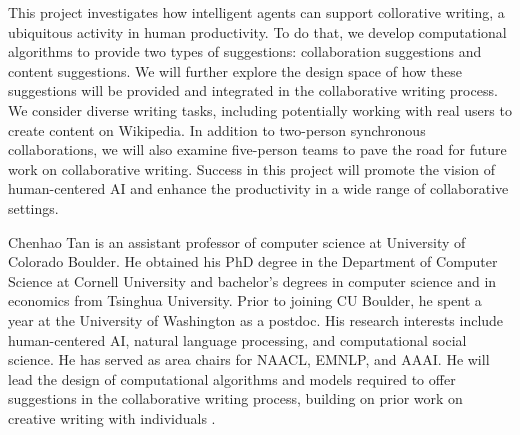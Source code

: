 







This project investigates how intelligent agents can support collorative writing, a ubiquitous activity in human productivity.
To do that, we develop computational algorithms to provide two types of suggestions: collaboration suggestions and content suggestions.
We will further explore the design space of how these suggestions will be provided and integrated in the collaborative writing process.
We consider diverse writing tasks, including potentially working with real users to create content on Wikipedia.
In addition to two-person synchronous collaborations, we will also examine five-person teams to pave the road for future work on collaborative writing.
Success in this project will promote the vision of human-centered AI and enhance the productivity in a wide range of collaborative settings.

Chenhao Tan is an assistant professor of computer science at University of Colorado Boulder. He obtained his PhD degree in the Department of Computer Science at Cornell University and bachelor's degrees in computer science and in economics from Tsinghua University. Prior to joining CU Boulder, he spent a year at the University of Washington as a postdoc. His research interests include human-centered AI, natural language processing, and computational social science. 
He has served as area chairs for NAACL, EMNLP, and AAAI.
He will lead the design of computational algorithms and models required to offer suggestions in the collaborative writing process, building on prior work on creative writing with individuals \citep{clark+etal18}.